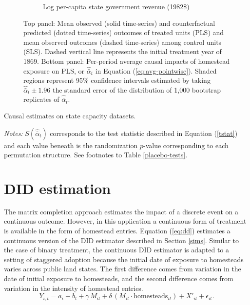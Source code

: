 \documentclass[12pt]{article}
\begin{document}
{\begin{figure}[htbp]
\begin{subfigure}[t]{0.8\textwidth}
		\caption{Log per-capita state government revenue (1982\$)\label{mc-estimates-rev-pc}}
	\end{subfigure}
	\caption{Top panel: Mean observed (solid time-series) and counterfactual predicted (dotted time-series) outcomes of treated units (PLS) and mean observed outcomes (dashed time-series) among control units (SLS). Dashed vertical line represents the initial treatment year of 1869. Bottom panel: Per-period average causal impacts of homestead exposure on PLS, or $\hat{\bar{\alpha}}_{t}$ in Equation (\ref{eq:avg-pointwise}). Shaded regions represent 95\% confidence intervals estimated by taking $\hat{\bar{\alpha}}_{t} \pm 1.96$ the standard error of the distribution of 1,000 bootstrap replicates of $\hat{\bar{\alpha}}_{t}$.\label{mc-estimates}} 
\end{figure}

\begin{table}[htbp]
	\captionsetup{font=normalsize}
	\caption{Causal estimates on state capacity datasets.\label{mc-estimates}}
	\begin{center}
		
	\end{center}
\footnotesize{\emph{Notes:} $S (\hat{\bar{\alpha}}_{t})$ corresponds to the test statistic described in Equation (\ref{tstat}) and each value beneath is the randomization $p$-value corresponding to each permutation structure. See footnotes to Table \ref{placebo-tests}.}
\end{table}

\section{DID estimation} \label{DID}

The matrix completion approach estimates the impact of a discrete event on a continuous outcome. However, in this application a continuous form of treatment is available in the form of homestead entries. Equation (\ref{eq:dd}) estimates a continuous version of the DID estimator described in Section \ref{sims}. Similar to the case of binary treatment, the continuous DID estimator is adapted to a setting of staggered adoption because the initial date of exposure to homesteads varies across public land states. The first difference comes from variation in the date of initial exposure to homesteads, and the second difference comes from variation in the intensity of homestead entries.
%
\begin{equation} %
Y_{i, t} =  a_i + b_t + \gamma \, M_{it} + \delta \, (M_{it} \cdot \text{homesteads}_{it}) + X'_{it}  + \epsilon_{it}. \label{eq:dd} 
\end{equation}

}
\end{document}
